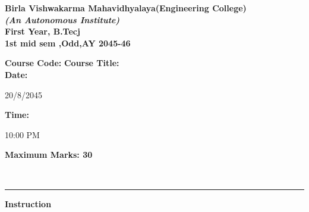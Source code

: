 \documentclass[addpoints]{exam}
\begin{document}
  \begin{large}        
  \begin{center} 
  
  \textbf{Birla Vishwakarma Mahavidhyalaya(Engineering College)} \\
  \textbf{\textit{(An Autonomous Institute)}} \\
  \textbf{First Year, B.Tecj} \\
  \textbf{1st mid sem ,Odd,AY 2045-46} \\
  \vspace{4mm}
  
  
  \end{center}
  \end{large}
  \begin{large}
  \textbf{Course Code:}  
  \hspace{20mm}
  \textbf{Course Title:}\vspace{2mm}\\
  \textbf{Date:} 
  \parbox[t]{37mm}{20/8/2045}
  \textbf{Time:}
  \parbox[t]{37mm}{10:00 PM}
  \textbf{Maximum Marks: 30}
  \end{large} \\
  \rule{162mm}{0.3mm}
  \textbf{Instruction}
  
  
\end{document}
